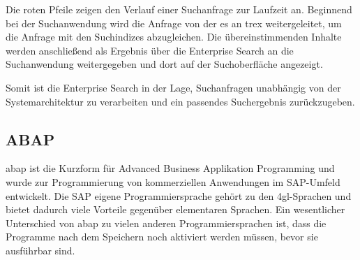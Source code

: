 Die roten Pfeile zeigen den Verlauf einer Suchanfrage zur Laufzeit an. Beginnend bei der Suchanwendung wird die Anfrage von der \ac{es} an \ac{trex} weitergeleitet, um die Anfrage mit den Suchindizes abzugleichen. Die übereinstimmenden Inhalte werden anschließend als Ergebnis über die Enterprise Search an die Suchanwendung weitergegeben und dort auf der Suchoberfläche angezeigt. \autocite[Vgl.][]{ESBWA}

Somit ist die Enterprise Search in der Lage, Suchanfragen unabhängig von der Systemarchitektur zu verarbeiten und ein passendes Suchergebnis zurückzugeben.



\subsection{ABAP}

\acs{abap} ist die Kurzform für Advanced Business Applikation Programming und wurde zur Programmierung von kommerziellen Anwendungen im SAP-Umfeld entwickelt.
Die SAP eigene Programmiersprache gehört zu den \ac{4gl}-Sprachen und bietet dadurch viele Vorteile gegenüber elementaren Sprachen.\autocite[Vgl.][S.25]{KELLER2015}
Ein wesentlicher Unterschied von \acs{abap} zu vielen anderen Programmiersprachen ist, dass die Programme nach dem Speichern noch aktiviert werden müssen, bevor sie ausführbar sind.

